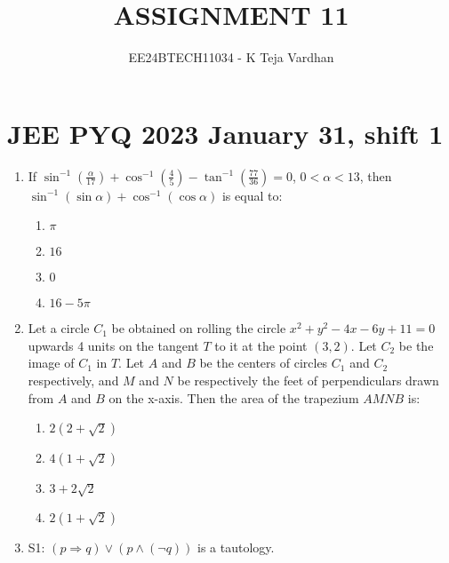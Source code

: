 \documentclass[journal]{IEEEtran}
\newcommand{\brak}[1]{\left( #1 \right)}
\newcommand{\lt}{<}
\begin{document}

\title{ASSIGNMENT 11}
\author{EE24BTECH11034 - K Teja Vardhan}
{\let\newpage\relax\maketitle}

\section{JEE PYQ 2023 January 31, shift 1}
\begin{enumerate}

    \item If $\sin^{-1}\brak{\frac{\alpha}{17}} + \cos^{-1}\brak{\frac{4}{5}} - \tan^{-1}\brak{\frac{77}{36}} = 0$, $0 \lt \alpha \lt 13$, then $\sin^{-1}\brak{\sin \alpha} + \cos^{-1}\brak{\cos \alpha}$ is equal to:
        
        \begin{multicols}{4}
        \begin{enumerate}
        \item $\pi$
        \item $16$
        \item $0$
        \item $16 - 5\pi$
        \end{enumerate}
        \end{multicols}

    \item Let a circle $C_{1}$ be obtained on rolling the circle $x^{2}+y^{2}-4x-6y+11=0$ upwards 4 units on the tangent $T$ to it at the point $\brak{3, 2}$. Let $C_{2}$ be the image of $C_{1}$ in $T$. Let $A$ and $B$ be the centers of circles $C_{1}$ and $C_{2}$ respectively, and $M$ and $N$ be respectively the feet of perpendiculars drawn from $A$ and $B$ on the x-axis. Then the area of the trapezium $AMNB$ is:
    
        \begin{multicols}{4}
        \begin{enumerate}
        \item $2\brak{2+\sqrt{2}}$
        \item $4\brak{1+\sqrt{2}}$
        \item $3+2\sqrt{2}$
        \item $2\brak{1+\sqrt{2}}$
        \end{enumerate}
        \end{multicols}
        
    \item S1: $\brak{p\Rightarrow q}\lor\brak{p\land\brak{\neg q}}$ is a tautology.


\end{enumerate}
\end{document}
